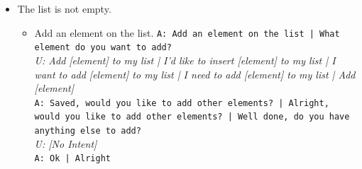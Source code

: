 \begin{itemize}
\begin{itemize}
		
	\end{itemize}	
	\item The list is not empty.\\
	\begin{itemize}
		\item Add an element on the list.
		\texttt{A: Add an element on the list | What element do you want to add?}\\
		\textit{U: Add [element] to my list | I'd like to insert [element] to my list | I want to add [element] to my list | I need to add [element] to my list | Add [element] }\\
		\texttt{A: Saved, would you like to add other elements? | Alright, would you like to add other elements? | Well done, do you have anything else to add?}\\
		\textit{U: [No Intent]}\\
		\texttt{A: Ok | Alright}

		

\end{itemize}
\end{itemize}
